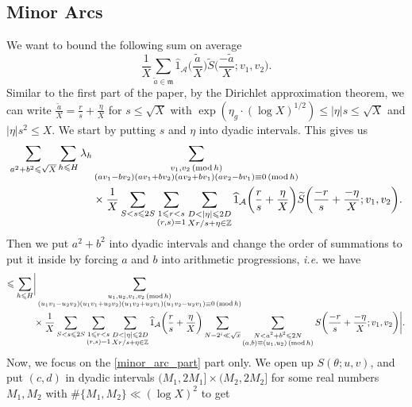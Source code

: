 \documentclass[12pt]{amsart}
\theoremstyle{definition}
\theoremstyle{definition}
\theoremstyle{remark}
\numberwithin{equation}{section}
\newcommand{\Z}{\mathbb{Z}}
\newcommand{\CA}{\mathcal{A}}
\newcommand{\m}{\mathfrak{m}}
\renewcommand{\leq}{\leqslant}
\renewcommand{\hat}{\widehat}
\renewcommand{\tilde}{\widetilde}
\renewcommand{\mod}[1]{\,({\rm mod}\,#1)}
\begin{document}
\subsection{Minor Arcs}
We want to bound the following sum on average 
$$ \frac{1}{X} \sum_{\tilde{a}\in \m} \hat{1}_{\CA} \bigg( \frac{\tilde{a}}{X}\bigg) \tilde{S}\bigg( \frac{-\tilde{a}}{X} ; v_1,v_2 \bigg) .$$
Similar to the first part of the paper, by the Dirichlet approximation theorem, we can write $\frac{\tilde{a}}{X} = \frac{r}{s} + \frac{\eta}{X}$ for $s\leq \sqrt{X}$ with $\exp(\eta_g\cdot (\log X)^{1/2}) \leq |\eta|s \leq \sqrt{X}$ and $|\eta| s^2 \leq X$.
We start by putting $s$ and $\eta$ into dyadic intervals. This gives us
\begin{align*}
\sum_{a^2+b^2 \leq \sqrt{X}}  \sum_{h\leq H} \lambda_h &\sum_{\substack{v_1,v_2 \mod h \\ (av_1 - bv_2)(av_1 + bv_2)(av_2 + b v_1)(av_2 - bv_1) \equiv 0 \mod h}} \\
&\times \frac{1}{X} \sum_{\substack{S<s\leq 2S}} \sum_{\substack{1 \leq r < s  \\ (r,s)=1}} \sum_{\substack{D<|\eta|\leq 2D \\ Xr/s + \eta\in \Z}} \hat{1}_{\CA}\bigg( \frac{r}{s} + \frac{\eta}{X} \bigg) \tilde{S}\bigg(  \frac{-r}{s} + \frac{-\eta}{X} ; v_1,v_2 \bigg) .
\end{align*}
Then we put $a^2+b^2$ into dyadic intervals and change the order of summations to put it inside by forcing $a$ and $b$ into arithmetic progressions, \textit{i.e.} we have
\begin{align}
\leq  \sum_{h\leq H}&\bigg|\sum_{\substack{u_1,u_2,v_1,v_2 \mod h \\ (u_1v_1 - u_2v_2)(u_1v_1 + u_2v_2)(u_1v_2 + u_2v_1)(u_1v_2 - u_2v_1)  \equiv 0 \mod h}} \notag \\
&\times\frac{1}{X} \sum_{\substack{S<s\leq 2S}}\sum_{\substack{1 \leq r < s  \\ (r,s)=1}} \sum_{\substack{D<|\eta|\leq 2D \\ Xr/s + \eta\in \Z}} \hat{1}_{\CA}\bigg( \frac{r}{s} + \frac{\eta}{X} \bigg) \sum_{N=2^i \ll \sqrt{x}} \sum_{\substack{N <a^2+b^2 \leq 2N \\ (a,b)\equiv (u_1,u_2)\mod h }}S\bigg(  \frac{-r}{s} + \frac{-\eta}{X} ; v_1,v_2 \bigg) \bigg| . \label{minor_arc_part}
\end{align}
Now, we focus on the \eqref{minor_arc_part} part only. We open up $S(\theta;u,v)$, and put $(c,d)$ in dyadic intervals $(M_1,2M_1]\times (M_2,2M_2]$ for some real numbers $M_1,M_2$ with $\#\{M_1, M_2\} \ll (\log X)^2$ to get
\end{document}
